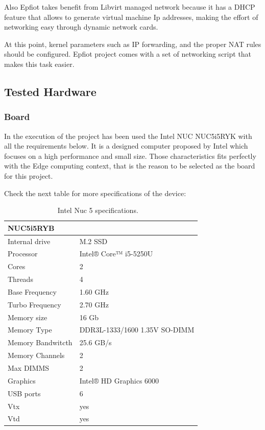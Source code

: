 Also Epfiot takes benefit from Libvirt managed network because it has a DHCP feature that allows to generate virtual machine Ip addresses, making the effort of networking easy through dynamic network cards.

At this point, kernel parameters such as IP forwarding, and the proper NAT rules should be configured. Epfiot project comes with a set of networking script that makes this task easier.


\subsection{Tested Hardware}
\label{makereference3.1.3}
\subsubsection{Board}

In the execution of the project has been used the Intel NUC NUC5i5RYK with all the requirements below. It is a designed computer proposed by Intel which focuses on a high performance and small size.
Those characteristics fits perfectly with the Edge computing context, that is the reason to be selected as the board for this project.

Check the next table for more specifications of the device:

\begin{table}[H]
    \begin{center}
    \begin{tabular}[b]{|l|l|}
        \hline
        \textbf{NUC5i5RYB} & \\
        \hline
        Internal drive & M.2 SSD\\
        Processor & Intel® Core™ i5-5250U \\
        Cores	 & 2\\
        Threads & 4\\
        Base Frequency & 1.60 GHz\\
        Turbo Frequency & 2.70 GHz\\
        Memory size & 16 Gb\\
        Memory Type & DDR3L-1333/1600 1.35V SO-DIMM\\
        Memory Bandwitcth & 25.6 GB/s\\
        Memory Channels & 2\\
        Max DIMMS & 2\\
        Graphics &  Intel® HD Graphics 6000\\
        USB ports & 6\\
        Vtx & yes\\
        Vtd & yes\\
        \hline
    \end{tabular}
    \caption{Intel Nuc 5 specifications. ~\cite{nuc_specs}}
    \label{table1}
   \end{center}
\end{table}

